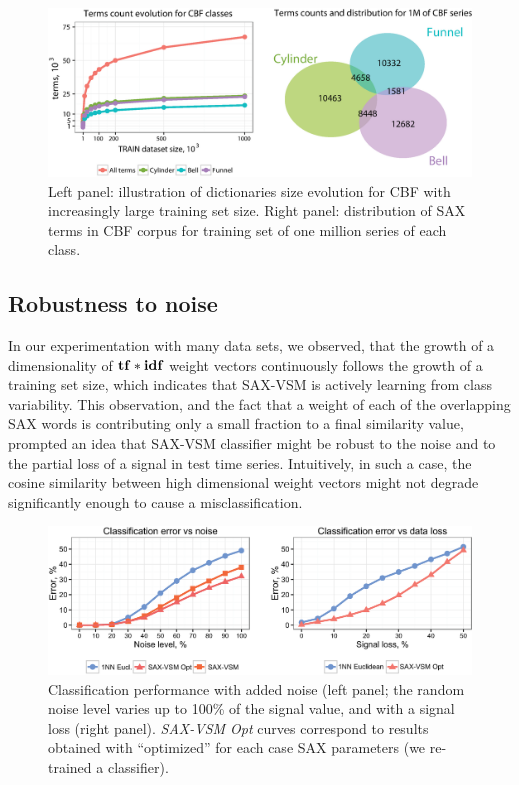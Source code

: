\begin{figure}[ht]
   \centering
   \includegraphics[width=120mm]{figures/Bubbles.eps}
   \caption{Left panel: illustration of dictionaries size evolution for CBF with
   increasingly large training set size. 
   Right panel: distribution of SAX terms in CBF corpus for training set of 
   one million series of each class.}
   \label{fig:venn}
\end{figure}

\subsection{Robustness to noise}
In our experimentation with many data sets, we observed, that the growth of a 
dimensionality of $\text{\textbf{tf}}\ast\text{\textbf{idf}}$ weight vectors continuously follows the growth of a
training set size, which indicates that SAX-VSM is actively learning from class variability.
This observation, and the fact that a weight of each of the overlapping SAX words is 
contributing only a small fraction to a final similarity value, prompted an idea that 
SAX-VSM classifier might be robust to the noise and to the partial loss of a signal in
test time series. Intuitively, in such a case, the cosine similarity between high dimensional 
weight vectors might not degrade significantly enough to cause a misclassification.

\begin{figure}[ht]
  \centering
  \includegraphics[width=120mm]{figures/corrupted.eps}
  \caption{Classification performance with added noise
  (left panel; the random noise level varies up to 100\% of the signal value,
  and with a signal loss (right panel). \textit{SAX-VSM Opt} curves correspond to 
  results obtained with ``optimized'' for each case SAX parameters 
  (we re-trained a classifier).}
  \label{fig:corrupted}
\end{figure}


